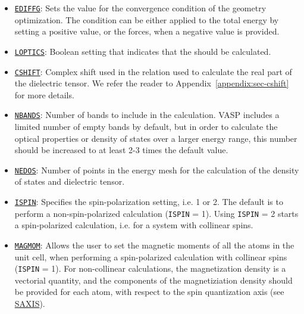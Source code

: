 \begin{refsection}
\begin{itemize}
 \label{appendix:sec-EDIFFG} 
\item \href{https://cms.mpi.univie.ac.at/wiki/index.php/EDIFFG}{\texttt{EDIFFG}}: 
Sets the value for the convergence condition of the geometry optimization. The 
condition can be either applied to the total energy by setting a positive value, 
or the forces, when a negative value is provided.
 
 \label{appendix:sec-LOPTICS} 
\item \href{https://cms.mpi.univie.ac.at/wiki/index.php/LOPTICS}{\texttt{LOPTICS}}: 
Boolean setting that indicates that the 
 should be 
calculated.

 \label{appendix:sec-CSHIFT} 
\item \href{https://cms.mpi.univie.ac.at/wiki/index.php/CSHIFT}{\texttt{CSHIFT}}: 
Complex shift used in the  relation used to calculate 
the real part of the dielectric tensor. We refer the reader to 
Appendix~\ref{appendix:sec-cshift} for more details.

 \label{appendix:sec-NBANDS} 
\item \href{https://cms.mpi.univie.ac.at/wiki/index.php/NBANDS}{\texttt{NBANDS}}: 
Number of bands to include in the calculation. VASP includes a limited 
number of empty bands by default, but in order to calculate the optical properties 
or density of states over a larger energy range, this number should be increased 
to at least 2-3 times the default value.

 \label{appendix:sec-NEDOS} 
\item \href{https://cms.mpi.univie.ac.at/wiki/index.php/NEDOS}{\texttt{NEDOS}}: 
Number of points in the energy mesh for the calculation of the density of states 
and dielectric tensor.
 
 \label{appendix:sec-ISPIN} 
\item \href{https://cms.mpi.univie.ac.at/wiki/index.php/ISPIN}{\texttt{ISPIN}}: 
Specifies the spin-polarization setting, i.e. 1 or 2. The default is to perform 
a non-spin-polarized calculation (\texttt{ISPIN} = 1). Using \texttt{ISPIN} = 2 
starts a spin-polarized calculation, i.e. for a system with collinear spins.
 
 \label{appendix:sec-MAGMOM} 
\item \href{https://cms.mpi.univie.ac.at/wiki/index.php/MAGMOM}{\texttt{MAGMOM}}: 
Allows the user to set the magnetic moments of all the atoms in the unit cell, 
when performing a spin-polarized calculation with collinear spins (\texttt{ISPIN} = 1).
For non-collinear calculations, the magnetization density is a vectorial quantity, 
and the components of the magnetiziation density should be provided for each atom, 
with respect to the spin quantization axis (see 
\href{https://cms.mpi.univie.ac.at/wiki/index.php/SAXIS}{SAXIS}).


\end{itemize}
\end{refsection}
